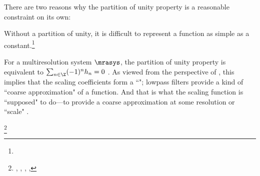 There are two reasons why the partition of unity property is a reasonable
constraint on its own:
\begin{liste}
   \item Without a partition of unity, it is difficult to represent a function as simple as a
         constant.\footnote{}

  \item For a multiresolution system $\mrasys$, the partition of unity property is equivalent to
        $\sum_{n\in\Z} (-1)^n h_n = 0$ .
        As viewed from the perspective of  ,
        this implies that the scaling coefficients form a ``"; 
        lowpass filters provide a kind of ``coarse approximation"
        of a function. And that is what the scaling function is ``supposed" to do---to provide a coarse approximation 
        at some resolution or ``scale" .
\end{liste}

\begin{definition}
\footnote{
  ,
  ,
  ,
  ,
  }
\label{def:pun}
\end{definition}

